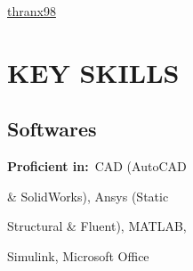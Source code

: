 \documentclass[11pt,A4,english]{article}
\begin{document}
\begin{paracol}{2}
\begin{leftcolumn}
\begin{addmargin}[0em]{0em}
            \hspace{-13.5pt} \faGithubAlt \hspace{5.5pt} \href{https://github.com/thranx98}{thranx98}
            \\

        \end{addmargin}

    \vspace{0cm}

    \section{KEY SKILLS}

    \vspace{-.25em}

        \begin{addmargin}[2em]{1em}

            \subsection{Softwares}
                \vspace{.25em}
                \begin{addmargin}[-3em]{0em}
                    
                    \vspace{0pt}

                    \hspace{15pt} \faCheckCircle \hspace{2.5pt} {\bfseries Proficient in:}\ CAD (AutoCAD\\ 
                    
                    \vspace{-12pt}
                    
                    \hspace{15pt}\& SolidWorks), Ansys (Static \\ 
                    
                    \vspace{-12pt}
                    
                    \hspace{15pt}Structural \& Fluent), MATLAB,\\
                    
                    \vspace{-12pt}
                    
                    \hspace{15pt}Simulink, Microsoft Office \\
                    

\end{addmargin}
\end{addmargin}
\end{leftcolumn}
\end{paracol}
\end{document}
